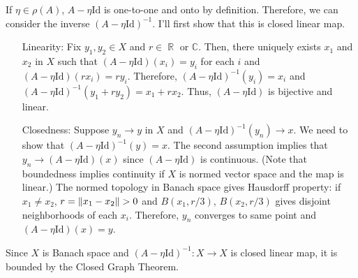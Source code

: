 \documentclass{article}
\DeclareMathOperator{\rr}{\mathbb{R}}
\begin{document}
If $\eta\in \rho(A)$, $A-\eta \text{Id}$ is one-to-one and onto by definition. Therefore, we can consider the inverse $(A-\eta \text{Id})^{-1}$. I'll first show that this is closed linear map.
\begin{enumerate}
\item[Linearity:] Fix $y_1, y_2\in X$ and $r\in \rr$ or $\mathbb{C}$. Then, there uniquely exists $x_1$ and $x_2$ in $X$ such that $(A-\eta \text{Id})(x_i)=y_i$ for each $i$ and $(A-\eta \text{Id})(rx_i)=ry_i$. Therefore, $(A-\eta \text{Id})^{-1}(y_i)=x_i$ and $(A-\eta \text{Id})^{-1}(y_1+ry_2)=x_1+rx_2$. Thus, $(A-\eta \text{Id})$ is bijective and linear.
\item[Closedness:] Suppose $y_n\rightarrow y$ in $X$ and $(A-\eta \text{Id})^{-1}(y_n)\rightarrow x$. We need to show that $(A-\eta \text{Id})^{-1}(y)=x$. The second assumption implies that $y_n\rightarrow (A-\eta \text{Id})(x)$ since $(A-\eta \text{Id})$ is continuous. (Note that boundedness implies continuity if $X$ is normed vector space and the map is linear.) The normed topology in Banach space gives Hausdorff property: if $x_1\neq x_2$, $r=\norm{x_1-x_2}>0$ and $B(x_1, r/3)$, $B(x_2, r/3)$ gives disjoint neighborhoods of each $x_i$. Therefore, $y_n$ converges to same point and $(A-\eta \text{Id})(x)=y$.
\end{enumerate}
Since $X$ is Banach space and $(A-\eta \text{Id})^{-1}:X\rightarrow X$ is closed linear map, it is bounded by the Closed Graph Theorem.
\end{document}
